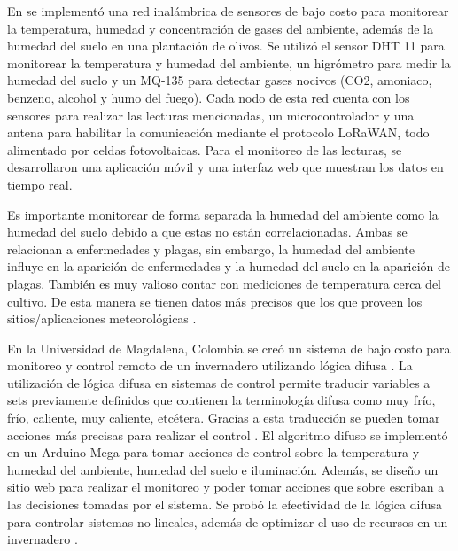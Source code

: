 En \cite{olive_orchard_monitorization} se implementó una red inalámbrica de sensores de bajo costo para monitorear la temperatura, humedad y concentración de gases 
del ambiente, además de la humedad del suelo en una plantación de olivos. Se utilizó el sensor DHT 11 para monitorear la temperatura y humedad del ambiente, un
higrómetro para medir la humedad del suelo y un MQ-135 para detectar gases nocivos (CO2, amoniaco, benzeno, alcohol y humo del fuego). Cada nodo de esta 
red cuenta con los sensores para realizar las lecturas mencionadas, un microcontrolador y una antena para habilitar la comunicación mediante el protocolo 
LoRaWAN, todo alimentado por celdas fotovoltaicas. Para el monitoreo de las lecturas, se desarrollaron una aplicación móvil y una interfaz web que 
muestran los datos en tiempo real.

Es importante monitorear de forma separada la humedad del ambiente como la humedad del suelo debido a que estas no están correlacionadas. Ambas se relacionan
a enfermedades y plagas, sin embargo, la humedad del ambiente influye en la aparición de enfermedades y la humedad del suelo en la aparición de plagas. También
es muy valioso contar con mediciones de temperatura cerca del cultivo. De esta manera se tienen datos más precisos que los que proveen los sitios/aplicaciones 
meteorológicas \cite{olive_orchard_monitorization}.

En la Universidad de Magdalena, Colombia se creó un sistema de bajo costo para monitoreo y control remoto de un invernadero utilizando lógica difusa \cite{low_cost_fuzzy_logic_greenhouse}. La utilización de lógica difusa en sistemas de control permite traducir variables a sets previamente definidos que contienen la 
terminología difusa como muy frío, frío, caliente, muy caliente, etcétera. Gracias a esta traducción se pueden tomar acciones más precisas para realizar el control \cite{agriculture_automation_review}. El algoritmo difuso se implementó en un Arduino Mega para tomar acciones de control sobre la temperatura y humedad del ambiente, humedad del suelo e iluminación. Además, se diseño un sitio web para realizar el monitoreo y poder tomar acciones que sobre escriban a las decisiones tomadas por el sistema. Se probó la efectividad de la lógica difusa para controlar sistemas no lineales, además de optimizar el uso de recursos en un invernadero \cite{low_cost_fuzzy_logic_greenhouse}.


